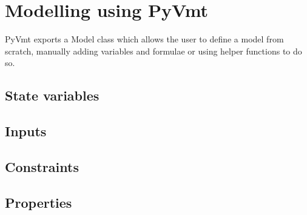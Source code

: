 \chapter{Modelling using PyVmt}
PyVmt exports a Model class which allows the user to define a model from scratch, manually adding variables and formulae or using helper functions to do so.

\section{State variables}
\section{Inputs}
\section{Constraints}
\section{Properties}
